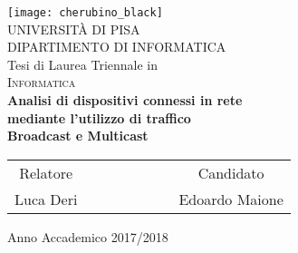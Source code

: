 \clearpage{\pagestyle{empty}\cleardoublepage}


\begin{titlepage}
 \begin{center}
     \texttt{[image: cherubino\_black]}\\
     \vspace{1em}
     {\Large \textsc{UNIVERSIT\`A DI PISA}}\\
     \vspace{1em}
     {\Large \textsc{DIPARTIMENTO DI INFORMATICA}}\\
     \vspace{2em}
     {\normalsize Tesi di Laurea Triennale in}\\
     \vspace{1em}
     {\Large \textsc{Informatica}}\\
     \vspace{5em}
     {\LARGE \textbf{Analisi di dispositivi connessi in rete}}\\
     \vspace{1em}
     {\LARGE \textbf{mediante l'utilizzo di traffico}}\\
     \vspace{1em}
     {\LARGE \textbf{Broadcast e Multicast}}\\
 \end{center}

\vskip 2.5cm
  \begin{center}
    \begin{tabular}{c c c c c c c c}
      Relatore & & & & & & & Candidato \\[0.2cm]
      \large{Luca Deri} & & & & & & & \large{Edoardo Maione}\\[0.4cm]
    \end{tabular}
  \end{center}

\vskip 2cm
\begin{center}
{\normalsize Anno Accademico 2017/2018}
\end{center}
\end{titlepage}

\clearpage{\pagestyle{empty}\cleardoublepage}

